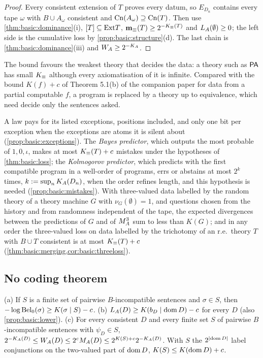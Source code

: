 \begin{proof}
Every consistent extension of $T$ proves every datum, so $E_{D_n}$ contains every tape $\omega$ with $B\cup A_\omega$ consistent and $\mathrm{Cn}(A_\omega)\supseteq\mathrm{Cn}(T)$. Then use \cref{thm:basic:dominance}(i), $[T]\subseteq\mathrm{Ext} T$, $\mathbf{m}_{\equiv}(T)\ge2^{-K_{\equiv}(T)}$ and $L_{A}(\emptyset)\ge0$; the left side is the cumulative loss by \cref{prop:basic:structure}(d). The last chain is \cref{thm:basic:dominance}(iii) and $W_{A}\ge2^{-K_{A}}$.
\end{proof}

The bound favours the weakest theory that decides the data: a theory such as $\mathsf{PA}$ has small $K_{\equiv}$ although every axiomatisation of it is infinite. Compared with the bound $K(f)+c$ of Theorem 5.1(b) of the companion paper for data from a partial computable $f$, a program is replaced by a theory up to equivalence, which need decide only the sentences asked.

A law pays for its listed exceptions, positions included, and only one bit per exception when the exceptions are atoms it is silent about (\cref{prop:basic:exceptions}). The \emph{Bayes predictor}, which outputs the most probable of $1,0,\iota$, makes at most $K_{\equiv}(T)+c$ mistakes under the hypotheses of \cref{thm:basic:loss}; the \emph{Kolmogorov predictor}, which predicts with the first compatible program in a well-order of programs, errs or abstains at most $2^k$ times, $k:=\sup_nK_{A}(D_n)$, when the order refines length, and this hypothesis is needed (\cref{prop:basic:mistakes}). With three-valued data labelled by the random theory of a theory machine $G$ with $\nu_G(\emptyset)=1$, and questions chosen from the history and from randomness independent of the tape, the expected divergences between the predictions of $G$ and of $M_{A}^{3}$ sum to less than $K(G)$; and in any order the three-valued loss on data labelled by the trichotomy of an r.e.\ theory $T$ with $B\cup T$ consistent is at most $K_{\equiv}(T)+c$ (\cref{thm:basic:merging,cor:basic:threeloss}).

\subsection{No coding theorem}\label{sec:basic:nocoding}

\begin{proposition}\label{prop:basic:chain}
(a) If $S$ is a finite set of pairwise $B$-incompatible sentences and $\sigma\in S$, then $-\log\mathrm{Bel}_0(\sigma)\ge K(\sigma\mid S)-c$. (b) $L_{A}(D)\ge K(b_D\mid\operatorname{dom} D)-c$ for every $D$ (also \cref{prop:basic:lower}). (c) For every consistent $D$ and every finite set $S$ of pairwise $B$-incompatible sentences with $\psi_D\in S$, $2^{-K_{A}(D)}\le W_{A}(D)\le2^cM_{A}(D)\le2^{K(S)+c}2^{-K_{A}(D)}$. With $S$ the $2^{\lvert\operatorname{dom} D\rvert}$ label conjunctions on the two-valued part of $\operatorname{dom} D$, $K(S)\le K(\operatorname{dom} D)+c$.
\end{proposition}

